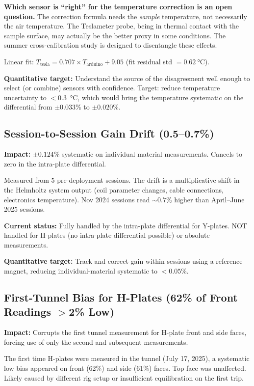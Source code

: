 \documentclass[11pt,letterpaper]{article}
\begin{document}
\textbf{Which sensor is ``right'' for the temperature correction is an open
question.} The correction formula needs the \emph{sample} temperature, not
necessarily the air temperature. The Teslameter probe, being in thermal contact
with the sample surface, may actually be the better proxy in some conditions. The
summer cross-calibration study is designed to disentangle these effects.

Linear fit: $T_{\mathrm{tesla}} = 0.707 \times T_{\mathrm{arduino}} + 9.05$
(fit residual std $= \SI{0.62}{\degreeCelsius}$).

\textbf{Quantitative target:} Understand the source of the disagreement well
enough to select (or combine) sensors with confidence. Target: reduce
temperature uncertainty to $<$\SI{0.3}{\degreeCelsius}, which would bring the
temperature systematic on the differential from $\pm 0.033\%$ to $\pm 0.020\%$.


\subsection{Session-to-Session Gain Drift (0.5--0.7\%)}
\label{sec:noise-gain}

\textbf{Impact:} $\pm 0.124\%$ systematic on individual material measurements.
Cancels to zero in the intra-plate differential.

Measured from 5 pre-deployment sessions. The drift is a multiplicative shift in
the Helmholtz system output (coil parameter changes, cable connections,
electronics temperature). Nov 2024 sessions read ${\sim}0.7\%$ higher than
April--June 2025 sessions.

\textbf{Current status:} Fully handled by the intra-plate differential for
Y-plates. NOT handled for H-plates (no intra-plate differential possible) or
absolute measurements.

\textbf{Quantitative target:} Track and correct gain within sessions using a
reference magnet, reducing individual-material systematic to $<0.05\%$.


\subsection{First-Tunnel Bias for H-Plates (62\% of Front Readings $>$2\% Low)}
\label{sec:noise-htunnel}

\textbf{Impact:} Corrupts the first tunnel measurement for H-plate front and
side faces, forcing use of only the second and subsequent measurements.

The first time H-plates were measured in the tunnel (July 17, 2025), a
systematic low bias appeared on front (62\%) and side (61\%) faces. Top face was
unaffected. Likely caused by different rig setup or insufficient equilibration on
the first trip.
\end{document}
